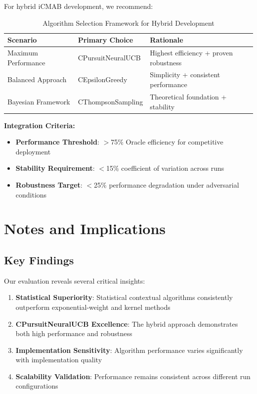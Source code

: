 \documentclass[12pt,a4paper]{article}
\newcommand{\primarytext}[1]{\textcolor{primaryblue}{\textbf{#1}}}
\newcommand{\secondarytext}[1]{\textcolor{secondaryblue}{\textbf{#1}}}
\newcommand{\success}[1]{\textcolor{accentgreen}{\textbf{#1}}}
\begin{document}
For hybrid iCMAB development, we recommend:

\begin{table}[H]
\centering
\caption{Algorithm Selection Framework for Hybrid Development}
\begin{tabular}{@{}lll@{}}
\toprule
\textbf{Scenario} & \textbf{Primary Choice} & \textbf{Rationale} \\
\midrule
Maximum Performance & CPursuitNeuralUCB & Highest efficiency + proven robustness \\
Balanced Approach & CEpsilonGreedy & Simplicity + consistent performance \\
Bayesian Framework & CThompsonSampling & Theoretical foundation + stability \\
\bottomrule
\end{tabular}
\end{table}

\textbf{Integration Criteria:}
\begin{itemize}
\item \textbf{Performance Threshold}: $>$75\% Oracle efficiency for competitive deployment
\item \textbf{Stability Requirement}: $<$15\% coefficient of variation across runs
\item \textbf{Robustness Target}: $<$25\% performance degradation under adversarial conditions
\end{itemize}


\newpage
\section{Notes and Implications}

\subsection{Key Findings}

Our evaluation reveals several critical insights:

\begin{enumerate}
\item \primarytext{Statistical Superiority}: Statistical contextual algorithms consistently outperform exponential-weight and kernel methods
\item \success{CPursuitNeuralUCB Excellence}: The hybrid approach demonstrates both high performance and robustness
\item \secondarytext{Implementation Sensitivity}: Algorithm performance varies significantly with implementation quality
\item \textbf{Scalability Validation}: Performance remains consistent across different run configurations
\end{enumerate}
\end{document}
